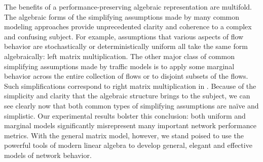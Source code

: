 \documentclass[twocolumn,final]{svjour3}
\begin{document}
The benefits of a performance-preserving algebraic representation are multifold. The algebraic forms of the simplifying assumptions made by many common modeling approaches provide unprecedented clarity and coherence to a complex and confusing subject. For example, assumptions that various aspects of flow behavior are stochastically or deterministically uniform all take the same form algebraically: left matrix multiplication. The other major class of common simplifying assumptions made by traffic models is to apply some marginal behavior across the entire collection of flows or to disjoint subsets of the flows. Such simplifications correspond to right matrix multiplication in . Because of the simplicity and clarity that the algebraic structure brings to the subject, we can see clearly now that both common types of simplifying assumptions are na\"ive and simplistic. Our experimental results bolster this conclusion: both uniform and marginal models significantly misrepresent many important network performance metrics. With the general matrix model, however, we stand poised to use the powerful tools of modern linear algebra to develop general, elegant and effective models of network behavior.




\end{document}
